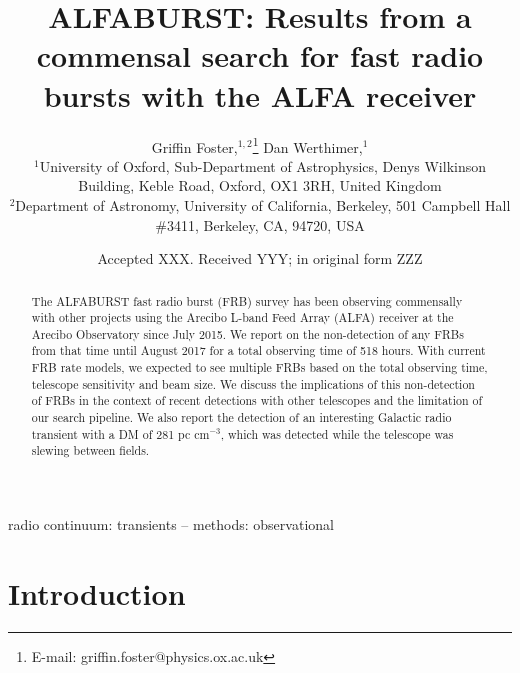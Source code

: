 \documentclass[a4paper,fleqn,usenatbib]{mnras}
\title[The ALFABURST Commensal FRB Survey]{ALFABURST: Results from a commensal search for
fast radio bursts with the ALFA receiver}
\author[G. Foster et al.]{
Griffin Foster,$^{1,2}$\thanks{E-mail: griffin.foster@physics.ox.ac.uk}
Dan Werthimer,$^{1}$
\\
$^{1}$University of Oxford, Sub-Department of Astrophysics, Denys Wilkinson Building, Keble Road, Oxford, OX1 3RH, United Kingdom\\
$^{2}$Department of Astronomy, University of California, Berkeley, 501 Campbell Hall \#3411, Berkeley, CA, 94720, USA\\
}
\date{Accepted XXX. Received YYY; in original form ZZZ}
\begin{document}
\label{firstpage}
\pagerange{\pageref{firstpage}--\pageref{lastpage}}
\maketitle

\begin{abstract}
The ALFABURST fast radio burst (FRB) survey has been observing commensally with
other projects using the Arecibo L-band Feed Array (ALFA) receiver at the
Arecibo Observatory since July 2015. We report on the non-detection of any FRBs
from that time until August 2017 for a total observing time of 518 hours.
With current FRB rate models, we expected to see multiple FRBs based on the
total observing time, telescope sensitivity and beam size. We discuss the
implications of this non-detection of FRBs in the context of recent detections
with other telescopes and the limitation of our search pipeline. We also report
the detection of an interesting Galactic radio transient with a DM of 281 pc
cm$^{-3}$, which was detected while the telescope was slewing between fields.
\end{abstract}

\begin{keywords}
radio continuum: transients -- methods: observational
\end{keywords}


\section{Introduction}
\label{sec:intro}
\end{document}
